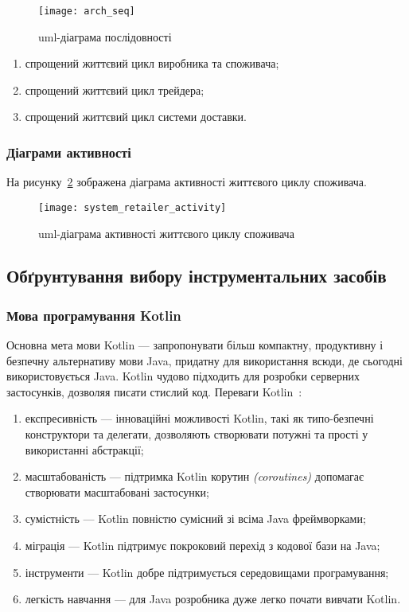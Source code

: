 \begin{figure}[H]
	\centering
	\texttt{[image: arch\_seq]}
	\caption{\acrshort{uml}-діаграма послідовності}
	\label{fig:arch_seq}
\end{figure} 

\begin{enumerate}[label={\arabic*)}]
	\item спрощений життєвий цикл виробника та споживача;
	\item спрощений життєвий цикл трейдера;
	\item спрощений життєвий цикл системи доставки.
\end{enumerate}

\subsubsection{Діаграми активності}
На рисунку~\ref{fig:system_retailer_activity} зображена діаграма активності життєвого циклу споживача.

\begin{figure}[H]
	\centering
	\texttt{[image: system\_retailer\_activity]}
	\caption{\acrshort{uml}-діаграма активності життєвого циклу споживача}
	\label{fig:system_retailer_activity}
\end{figure} 

\subsection{Обґрунтування вибору інструментальних засобів}
\subsubsection{Мова програмування Kotlin}
Основна мета мови Kotlin --- запропонувати більш компактну, продуктивну і безпечну альтернативу мови Java, придатну для використання всюди, де сьогодні використовується Java.
Kotlin чудово підходить для розробки серверних застосунків, дозволяя писати стислий код.
Переваги Kotlin~\cite{kotlin,Panchal2017}:  
\begin{enumerate}[label={\arabic*)}]
	\item експресивність --- інноваційні можливості Kotlin, такі як типо-безпечні конструктори та делегати, дозволяють створювати потужні та прості у використанні абстракції;
	\item масштабованість --- підтримка Kotlin корутин \textit{(coroutines)} допомагає створювати масштабовані застосунки;
	\item сумістність --- Kotlin повністю сумісний зі всіма Java фреймворками;
	\item міграція --- Kotlin підтримує покроковий перехід з кодової бази на Java;
	\item інструменти --- Kotlin добре підтримується середовищами програмування;
	\item легкість навчання --- для Java розробника дуже легко почати вивчати Kotlin.
\end{enumerate}

